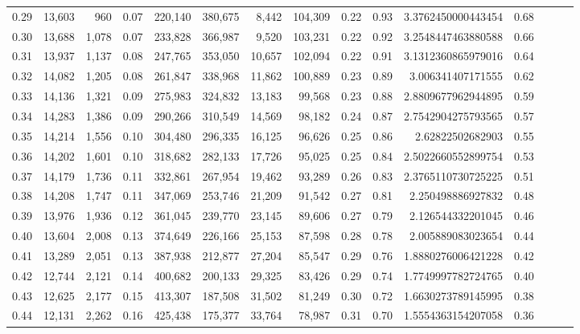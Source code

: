 \begin{tabular}{rrrrrrrrrrrrrrr}
0.29 &  13,603 &    960 &  0.07 &  220,140 &  380,675 &    8,442 &  104,309 &  0.22 &  0.93 &     3.3762450000443454 &      0.68 \\
0.30 &  13,688 &  1,078 &  0.07 &  233,828 &  366,987 &    9,520 &  103,231 &  0.22 &  0.92 &     3.2548447463880588 &      0.66 \\
0.31 &  13,937 &  1,137 &  0.08 &  247,765 &  353,050 &   10,657 &  102,094 &  0.22 &  0.91 &     3.1312360865979016 &      0.64 \\
0.32 &  14,082 &  1,205 &  0.08 &  261,847 &  338,968 &   11,862 &  100,889 &  0.23 &  0.89 &      3.006341407171555 &      0.62 \\
0.33 &  14,136 &  1,321 &  0.09 &  275,983 &  324,832 &   13,183 &   99,568 &  0.23 &  0.88 &     2.8809677962944895 &      0.59 \\
0.34 &  14,283 &  1,386 &  0.09 &  290,266 &  310,549 &   14,569 &   98,182 &  0.24 &  0.87 &     2.7542904275793565 &      0.57 \\
0.35 &  14,214 &  1,556 &  0.10 &  304,480 &  296,335 &   16,125 &   96,626 &  0.25 &  0.86 &       2.62822502682903 &      0.55 \\
0.36 &  14,202 &  1,601 &  0.10 &  318,682 &  282,133 &   17,726 &   95,025 &  0.25 &  0.84 &     2.5022660552899754 &      0.53 \\
0.37 &  14,179 &  1,736 &  0.11 &  332,861 &  267,954 &   19,462 &   93,289 &  0.26 &  0.83 &     2.3765110730725225 &      0.51 \\
0.38 &  14,208 &  1,747 &  0.11 &  347,069 &  253,746 &   21,209 &   91,542 &  0.27 &  0.81 &      2.250498886927832 &      0.48 \\
0.39 &  13,976 &  1,936 &  0.12 &  361,045 &  239,770 &   23,145 &   89,606 &  0.27 &  0.79 &      2.126544332201045 &      0.46 \\
0.40 &  13,604 &  2,008 &  0.13 &  374,649 &  226,166 &   25,153 &   87,598 &  0.28 &  0.78 &      2.005889083023654 &      0.44 \\
0.41 &  13,289 &  2,051 &  0.13 &  387,938 &  212,877 &   27,204 &   85,547 &  0.29 &  0.76 &     1.8880276006421228 &      0.42 \\
0.42 &  12,744 &  2,121 &  0.14 &  400,682 &  200,133 &   29,325 &   83,426 &  0.29 &  0.74 &     1.7749997782724765 &      0.40 \\
0.43 &  12,625 &  2,177 &  0.15 &  413,307 &  187,508 &   31,502 &   81,249 &  0.30 &  0.72 &     1.6630273789145995 &      0.38 \\
0.44 &  12,131 &  2,262 &  0.16 &  425,438 &  175,377 &   33,764 &   78,987 &  0.31 &  0.70 &     1.5554363154207058 &      0.36 \\

\end{tabular}
